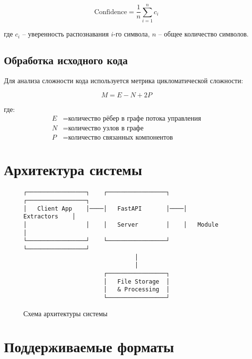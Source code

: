 \documentclass[12pt,a4paper]{article}
\begin{document}
\begin{equation}
\text{Confidence} = \frac{1}{n} \sum_{i=1}^{n} c_i
\end{equation}

где $c_i$ -- уверенность распознавания $i$-го символа, $n$ -- общее количество символов.

\subsection{Обработка исходного кода}

Для анализа сложности кода используется метрика цикломатической сложности:

\begin{equation}
M = E - N + 2P
\end{equation}

где:
\begin{align}
E &= \text{количество рёбер в графе потока управления} \\
N &= \text{количество узлов в графе} \\
P &= \text{количество связанных компонентов}
\end{align}

\section{Архитектура системы}

\begin{figure}[htbp]
    \centering
    \begin{minipage}{0.8\textwidth}
        \begin{verbatim}
┌─────────────────┐    ┌─────────────────┐    ┌─────────────────┐
│   Client App    │────│   FastAPI       │────│   Extractors    │
│                 │    │   Server        │    │   Module        │
└─────────────────┘    └─────────────────┘    └─────────────────┘
                                │
                                │
                       ┌─────────────────┐
                       │   File Storage  │
                       │   & Processing  │
                       └─────────────────┘
        \end{verbatim}
    \end{minipage}
    \caption{Схема архитектуры системы}
    \label{fig:architecture}
\end{figure}

\section{Поддерживаемые форматы}
\end{document}

